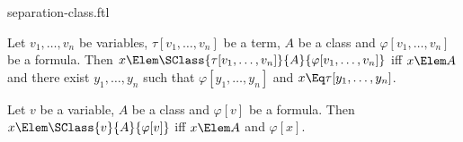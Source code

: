 \documentclass{stex}
\begin{document}
\begin{smodule}{separation-class.ftl}


\begin{fakeforthel}
  \begin{axiom*}
    Let $v_1,\dots,v_n$ be variables, $\tau[v_1,\dots,v_n]$ be a term, $A$ be a class and $\varphi[v_1,\dots,v_n]$ be a formula.
    Then $x \Elem \SClass{\tau[v_1,\dots,v_n]}{A}{\varphi[v_1,\dots,v_n]}$ iff
    $x \Elem A$ and there exist $y_1,\dots,y_n$ such that $\varphi[y_1,\dots,y_n]$ and $x \Eq \tau[y_1,\dots,y_n]$.
  \end{axiom*}
\end{fakeforthel}

\begin{fakeforthel}
  \begin{proposition*}
    Let $v$ be a variable, $A$ be a class and $\varphi[v]$ be a formula.
    Then $x \Elem \SClass{v}{A}{\varphi[v]}$ iff $x \Elem A$ and $\varphi[x]$.
  \end{proposition*}
\end{fakeforthel}

\end{smodule}
\end{document}
